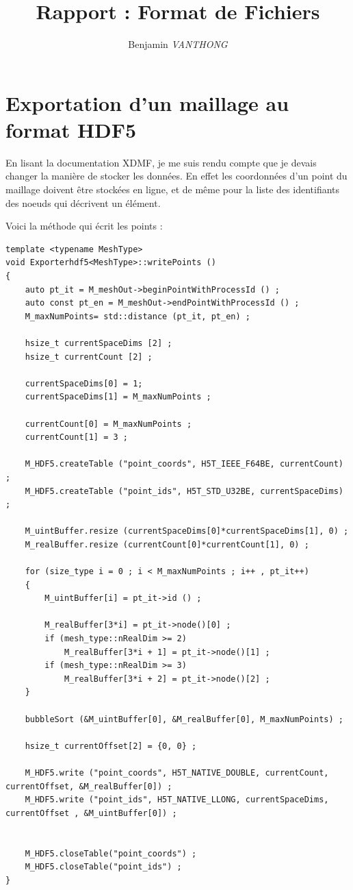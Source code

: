 \documentclass[12pt]{article}
\title {Rapport : Format de Fichiers}
\author {Benjamin \emph{VANTHONG}}
\begin{document}
\maketitle 
\section {Exportation d'un maillage au format HDF5}
En lisant la documentation XDMF, je me suis rendu compte que je devais changer la manière de stocker les données. En effet les coordonnées d'un  point du maillage doivent être stockées en ligne, et de même pour la liste des identifiants des noeuds qui décrivent un élément.\newline

Voici la méthode qui écrit les points :
\begin{lstlisting}
template <typename MeshType>
void Exporterhdf5<MeshType>::writePoints () 
{
    auto pt_it = M_meshOut->beginPointWithProcessId () ;
    auto const pt_en = M_meshOut->endPointWithProcessId () ;
    M_maxNumPoints= std::distance (pt_it, pt_en) ;

    hsize_t currentSpaceDims [2] ;
    hsize_t currentCount [2] ;

    currentSpaceDims[0] = 1;
    currentSpaceDims[1] = M_maxNumPoints ;

    currentCount[0] = M_maxNumPoints ;
    currentCount[1] = 3 ;

    M_HDF5.createTable ("point_coords", H5T_IEEE_F64BE, currentCount) ;
    M_HDF5.createTable ("point_ids", H5T_STD_U32BE, currentSpaceDims) ;

    M_uintBuffer.resize (currentSpaceDims[0]*currentSpaceDims[1], 0) ;
    M_realBuffer.resize (currentCount[0]*currentCount[1], 0) ;

    for (size_type i = 0 ; i < M_maxNumPoints ; i++ , pt_it++) 
    {
        M_uintBuffer[i] = pt_it->id () ;

        M_realBuffer[3*i] = pt_it->node()[0] ;
        if (mesh_type::nRealDim >= 2)
            M_realBuffer[3*i + 1] = pt_it->node()[1] ;
        if (mesh_type::nRealDim >= 3)
            M_realBuffer[3*i + 2] = pt_it->node()[2] ;
    }

    bubbleSort (&M_uintBuffer[0], &M_realBuffer[0], M_maxNumPoints) ;

    hsize_t currentOffset[2] = {0, 0} ;

    M_HDF5.write ("point_coords", H5T_NATIVE_DOUBLE, currentCount, currentOffset, &M_realBuffer[0]) ;
    M_HDF5.write ("point_ids", H5T_NATIVE_LLONG, currentSpaceDims, currentOffset , &M_uintBuffer[0]) ;


    M_HDF5.closeTable("point_coords") ;
    M_HDF5.closeTable("point_ids") ;
}
\end{lstlisting}
\end{document}
